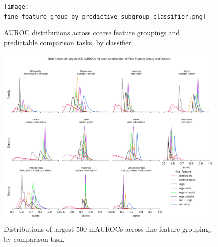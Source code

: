 \documentclass{article}  %
\begin{document}
\begin{spacing}{1}
\begin{figure}
\begin{center}
\texttt{[image: fine\_feature\_group\_by\_predictive\_subgroup\_classifier.png]}
\end{center}
\caption
{ \label{fig:fine-classifier}
AUROC distributions across coarse feature groupings and predictable comparison tasks, by classifier.}
\end{figure}



\begin{figure}
\begin{center}
\includegraphics[width=\textwidth,height=0.9\textheight,keepaspectratio]{fine_feature_largest_by_subgroup.png}
\end{center}
\caption
{ \label{fig:fine-largest}
Distributions of largest 500 mAUROCs across fine feature grouping, by comparison task.}
\end{figure}



\end{spacing}
\end{document}
